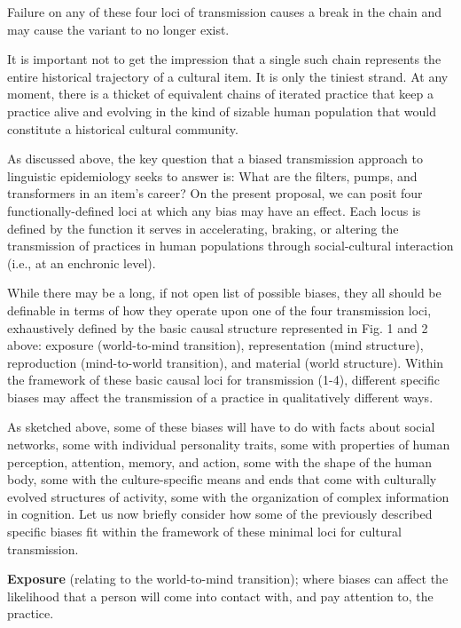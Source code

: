 Failure on any of these four loci of transmission causes a break in the 
chain and may cause the variant to no longer exist. 



It is important not to get the impression that a single such chain 
represents the entire historical trajectory of a cultural item. It is 
only the tiniest strand. At any moment, there is a thicket of equivalent 
chains of iterated practice that keep a practice alive and evolving in 
the kind of sizable human population that would constitute a historical 
cultural community. 



As discussed above, the key question that a biased transmission approach 
to linguistic epidemiology seeks to answer is: What are the filters, 
pumps, and transformers in an item's career? On the present proposal, we 
can posit four functionally-defined loci at which any bias may have an 
effect. Each locus is defined by the function it serves in accelerating, 
braking, or altering the transmission of practices in human populations 
through social-cultural interaction (i.e., at an enchronic level). 



While there may be a long, if not open list of possible biases, they all 
should be definable in terms of how they operate upon one of the four 
transmission loci, exhaustively defined by the basic causal structure 
represented in Fig. 1 and 2 above: exposure (world-to-mind transition), 
representation (mind structure), reproduction (mind-to-world 
transition), and material (world structure). Within the framework of 
these basic causal loci for transmission (1-4), different specific 
biases may affect the transmission of a practice in qualitatively 
different ways. 



As sketched above, some of these biases will have to do with facts about 
social networks, some with individual personality traits, some with 
properties of human perception, attention, memory, and action, some with 
the shape of the human body, some with the culture-specific means and 
ends that come with culturally evolved structures of activity, some with 
the organization of complex information in cognition. Let us now briefly 
consider how some of the previously described specific biases fit within 
the framework of these minimal loci for cultural transmission.



\textbf{Exposure }(relating to the world-to-mind transition); where 
biases can affect the likelihood that a person will come into contact 
with, and pay attention to, the practice.



